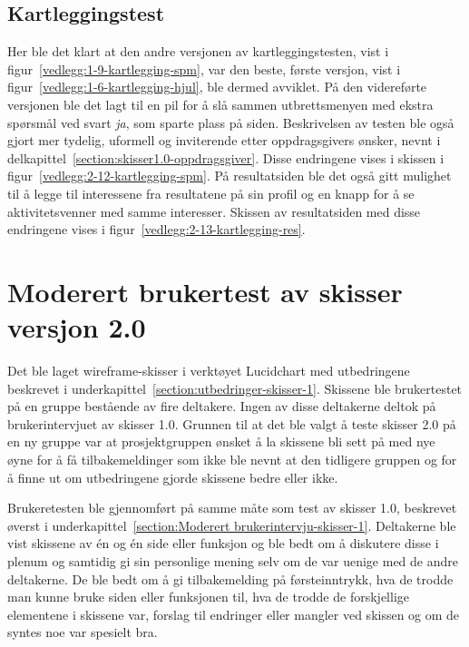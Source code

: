  \subsection{Kartleggingstest}
 
 Her ble det klart at den andre versjonen av kartleggingstesten, vist i figur~\ref{vedlegg:1-9-kartlegging-spm}, var den beste, første versjon, vist i figur~\ref{vedlegg:1-6-kartlegging-hjul}, ble dermed avviklet. På den videreførte versjonen ble det lagt til en pil for å slå sammen utbrettsmenyen med ekstra spørsmål ved svart {\em  ja}, som sparte plass på siden. Beskrivelsen av testen ble også gjort mer tydelig, uformell og inviterende etter oppdragsgivers ønsker, nevnt i delkapittel~\ref{section:skisser1.0-oppdragsgiver}. Disse endringene vises i skissen i figur~\ref{vedlegg:2-12-kartlegging-spm}. På resultatsiden ble det også gitt mulighet til å legge til interessene fra resultatene på sin profil og en knapp for å se aktivitetsvenner med samme interesser. Skissen av resultatsiden med disse endringene vises i figur~\ref{vedlegg:2-13-kartlegging-res}.
 
\section{Moderert brukertest av skisser versjon 2.0}
\label{section:brukertest-skisser2.0}
 
Det ble laget wireframe-skisser i verktøyet Lucidchart med utbedringene beskrevet i underkapittel~\ref{section:utbedringer-skisser-1}. Skissene ble brukertestet på en gruppe bestående av fire deltakere. Ingen av disse deltakerne deltok på brukerintervjuet av skisser 1.0. Grunnen til at det ble valgt å teste skisser 2.0 på en ny gruppe var at prosjektgruppen ønsket å la skissene bli sett på med nye øyne for å få tilbakemeldinger som ikke ble nevnt at den tidligere gruppen og for å finne ut om utbedringene gjorde skissene bedre eller ikke.


Brukeretesten ble gjennomført på samme måte som test av skisser 1.0, beskrevet øverst i  underkapittel~\ref{section:Moderert brukerintervju-skisser-1}. Deltakerne ble vist skissene av én og én side eller funksjon og ble bedt om å diskutere disse i plenum og samtidig gi sin personlige mening selv om de var uenige med de andre deltakerne. De ble bedt om å gi tilbakemelding på førsteinntrykk, hva de trodde man kunne bruke siden eller funksjonen til, hva de trodde de forskjellige elementene i skissene var, forslag til endringer eller mangler ved skissen og om de syntes noe var spesielt bra.

